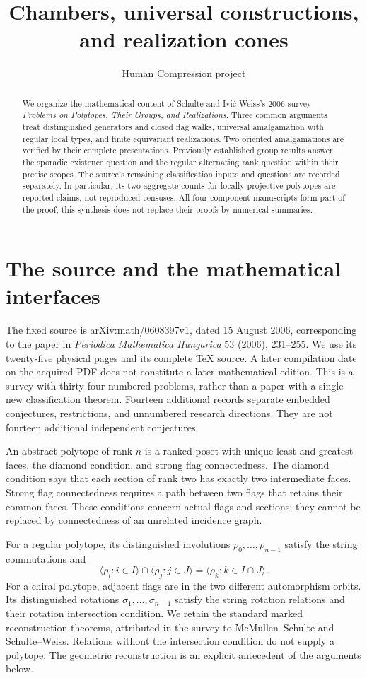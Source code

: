 \documentclass[11pt,a4paper]{article}
\title{Chambers, universal constructions, and realization cones}
\author{Human Compression project}\date{}
\newcommand{\gen}[1]{\langle #1\rangle}
\begin{document}
\maketitle
\begin{abstract}
We organize the mathematical content of Schulte and Ivi\'c Weiss's
2006 survey \emph{Problems on Polytopes, Their Groups, and Realizations}.
Three common arguments treat distinguished generators and closed flag
walks, universal amalgamation with regular local types, and finite
equivariant realizations. Two oriented amalgamations are verified by
their complete presentations. Previously established group results
answer the sporadic existence question and the regular alternating
rank question within their precise scopes. The source's remaining
classification inputs and questions are recorded separately. In
particular, its two aggregate counts for locally projective polytopes
are reported claims, not reproduced censuses. All four component
manuscripts form part of the proof; this synthesis does not replace
their proofs by numerical summaries.
\end{abstract}

\section{The source and the mathematical interfaces}

The fixed source is arXiv:math/0608397v1, dated 15 August 2006,
corresponding to the paper in \emph{Periodica Mathematica Hungarica}
53 (2006), 231--255. We use its twenty-five physical pages and its
complete TeX source. A later compilation date on the acquired PDF
does not constitute a later mathematical edition. This is a survey
with thirty-four numbered problems, rather than a paper with a
single new classification theorem. Fourteen additional records
separate embedded conjectures, restrictions, and unnumbered research
directions. They are not fourteen additional independent conjectures.

An abstract polytope of rank $n$ is a ranked poset with unique least
and greatest faces, the diamond condition, and strong flag
connectedness. The diamond condition says that each section of
rank two has exactly two intermediate faces. Strong flag
connectedness requires a path between two flags that retains
their common faces. These conditions concern actual flags and
sections; they cannot be replaced by connectedness of an
unrelated incidence graph.

For a regular polytope, its distinguished involutions
$\rho_0,\ldots,\rho_{n-1}$ satisfy the string commutations and
\[
 \gen{\rho_i:i\in I}\cap\gen{\rho_j:j\in J}
       =\gen{\rho_k:k\in I\cap J}.
\]
For a chiral polytope, adjacent flags are in the two different
automorphism orbits. Its distinguished rotations
$\sigma_1,\ldots,\sigma_{n-1}$ satisfy the string rotation relations
and their rotation intersection condition. We retain the standard
marked reconstruction theorems, attributed in the survey to
McMullen--Schulte and Schulte--Weiss. Relations without the
intersection condition do not supply a polytope. The geometric
reconstruction is an explicit antecedent of the arguments below.
\end{document}
